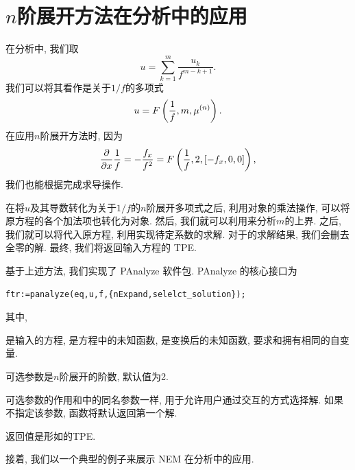 \section{$n$阶展开方法在\Painleve{}分析中的应用}
在\Painleve{}分析中, 我们取
\begin{equation}
    u=\sum_{k=1}^{m}\frac{u_k}{f^{m-k+1}}. \label{TPE-pkg}
\end{equation}
我们可以将其看作是关于$1/f$的多项式
\begin{equation}
    u=F\left(\frac{1}{f},m,\mu^{(n)}\right).
\end{equation}
在应用$n$阶展开方法时, 因为 
\begin{equation}
    \frac{\partial}{\partial x}{\frac{1}{f}}=-\frac{f_x}{f^2}=F\left(\frac{1}{f},2,\left[-f_x,0,0\right]\right),
\end{equation}
我们也能根据完成求导操作. 

在将$u$及其导数转化为关于$1/f$的$n$阶展开多项式之后, 利用对象的乘法操作, 可以将原方程的各个加法项也转化为对象. 然后, 我们就可以利用来分析$m$的上界. 之后, 我们就可以将代入原方程, 利用实现待定系数的求解. 对于的求解结果, 我们会删去全零的解. 最终, 我们将返回输入方程的 TPE. 

基于上述方法, 我们实现了 PAnalyze 软件包. PAnalyze 的核心接口为
\begin{verbatim}
ftr:=panalyze(eq,u,f,{nExpand,selelct_solution});
\end{verbatim}
其中,
\begin{compactitem}[\textbullet]
\item {}是输入的方程, 是方程中的未知函数, 是变换后的未知函数, 要求和拥有相同的自变量.
\item 可选参数是$n$阶展开的阶数, 默认值为2.
\item 可选参数的作用和中的同名参数一样, 用于允许用户通过交互的方式选择解. 如果不指定该参数, 函数将默认返回第一个解. 
\item 返回值是形如的TPE. 
\end{compactitem}

接着, 我们以一个典型的例子来展示 NEM 在\Painleve{}分析中的应用.

